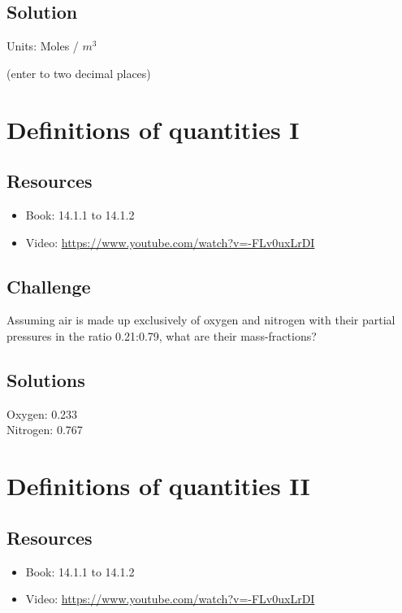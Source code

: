 \subsection*{Solution}
Units: Moles / $m^3$

(enter to two decimal places)





\newpage
\section{Definitions of quantities I}

\subsection*{Resources}
\begin{itemize}
    \item Book: 14.1.1 to 14.1.2
    \item Video: \url{https://www.youtube.com/watch?v=-FLv0uxLrDI}
\end{itemize}

\subsection*{Challenge}
Assuming air is made up exclusively of oxygen and nitrogen with their partial pressures in the ratio 0.21:0.79, what are their mass-fractions?

\subsection*{Solutions}
Oxygen: 0.233 \\
Nitrogen: 0.767




\newpage
\section{Definitions of quantities II}

\subsection*{Resources}
\begin{itemize}
    \item Book: 14.1.1 to 14.1.2
    \item Video: \url{https://www.youtube.com/watch?v=-FLv0uxLrDI}
\end{itemize}

